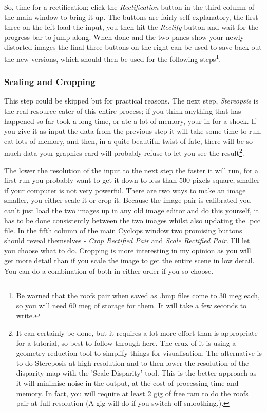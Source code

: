 \documentclass[10pt,a4paper,twoside]{article}
\begin{document}
So, time for a rectification; click the \emph{Rectification} button in the third column of the main window to bring it up. The buttons are fairly self explanatory, the first three on the left load the input, you then hit the \emph{Rectify} button and wait for the progress bar to jump along. When done and the two panes show your newly distorted images the final three buttons on the right can be used to save back out the new versions, which should then be used for the following steps\footnote{Be warned that the roofs pair when saved as .bmp files come to 30 meg each, so you will need 60 meg of storage for them. It will take a few seconds to write.}.


\subsubsection {Scaling and Cropping}
This step could be skipped but for practical reasons. The next step, \emph{Stereopsis} is the real resource eater of this entire process; if you think anything that has happened so far took a long time, or ate a lot of memory, your in for a shock. If you give it as input the data from the previous step it will take some time to run, eat lots of memory, and then, in a quite beautiful twist of fate, there will be so much data your graphics card will probably refuse to let you see the result\footnote{It can certainly be done, but it requires a lot more effort than is appropriate for a tutorial, so best to follow through here. The crux of it is using a geometry reduction tool to simplify things for visualisation. The alternative is to do Stereposis at high resolution and to then lower the resolution of the disparity map with the 'Scale Disparity' tool. This is the better approach as it will minimise noise in the output, at the cost of processing time and memory. In fact, you will require at least 2 gig of free ram to do the roofs pair at full resolution (A gig will do if you switch off smoothing.).}.

The lower the resolution of the input to the next step the faster it will run, for a first run you probably want to get it down to less than 500 pixels square, smaller if your computer is not very powerful. There are two ways to make an image smaller, you either scale it or crop it. Because the image pair is calibrated you can't just load the two images up in any old image editor and do this yourself, it has to be done consistently between the two images whilst also updating the .pcc file. In the fifth column of the main Cyclops window two promising buttons should reveal themselves - \emph{Crop Rectified Pair} and \emph{Scale Rectified Pair}. I'll let you choose what to do. Cropping is more interesting in my opinion as you will get more detail than if you scale the image to get the entire scene in low detail. You can do a combination of both in either order if you so choose.
\end{document}
